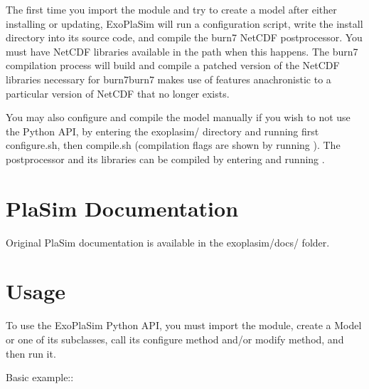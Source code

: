 \documentclass[letterpaper,10pt,english]{sphinxmanual}
\begin{document}
The first time you import the module and try to create a model
after either installing or updating, ExoPlaSim will run a
configuration script, write the install directory into its
source code, and compile the burn7 NetCDF postprocessor. You must
have NetCDF libraries available in the path when this happens.
The burn7 compilation process will build and compile a patched
version of the NetCDF libraries necessary for burn7\textendash{}burn7 makes
use of features anachronistic to a particular version of NetCDF
that no longer exists.

You may also configure and compile the model manually if you wish
to not use the Python API, by entering the exoplasim/ directory
and running first configure.sh, then compile.sh (compilation flags
are shown by running ). The postprocessor and its
libraries can be compiled by entering  and
running .


\chapter{PlaSim Documentation}
\label{\detokenize{index:plasim-documentation}}
Original PlaSim documentation is available in the exoplasim/docs/
folder.


\chapter{Usage}
\label{\detokenize{index:usage}}
To use the ExoPlaSim Python API, you must import the module, create
a Model or one of its subclasses, call its configure method and/or
modify method, and then run it.

Basic example::

\begin{sphinxVerbatim}[commandchars=\\\{\}]
   
  
\end{sphinxVerbatim}
\end{document}
